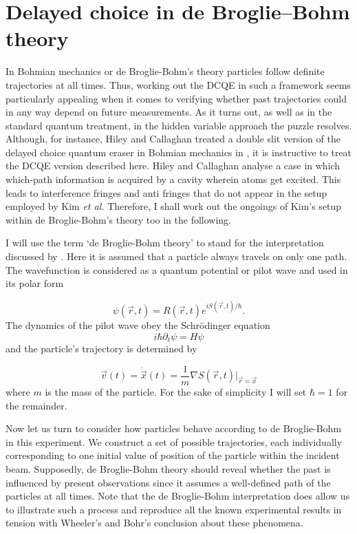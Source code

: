 \documentclass[11pt]{article}
\numberwithin{equation}{section}
\begin{document}
\section{Delayed choice in de Broglie–Bohm theory}
\label{Bohm}

In Bohmian mechanics or de Broglie-Bohm's theory particles follow definite trajectories at all times. Thus, working out the DCQE in such a framework seems particularly appealing when it comes to verifying whether past trajectories could in any way depend on future measurements. As it turns out, as well as in the standard quantum treatment, in the hidden variable approach the puzzle resolves. Although, for instance, Hiley and Callaghan treated a double slit version of the delayed choice quantum eraser in Bohmian mechanics in \cite{hiley2006erased}, it is instructive to treat the DCQE version described here. Hiley and Callaghan analyse a case in which which-path information is acquired by a cavity wherein atoms get excited. This leads to interference fringes and anti fringes that do not appear in the setup employed by Kim \textit{et al.} Therefore, I shall work out the ongoings of Kim's setup within de Broglie-Bohm's theory too in the following. 

I will use the term `de Broglie-Bohm theory' to stand for the interpretation discussed by \cite{bohm2006undivided}. Here it is assumed that a particle always travels on only one path. The wavefunction is considered as a quantum potential or pilot wave and used in its polar form

\begin{equation}
\psi(\vec{r},t)=R(\vec{r},t)e^{iS(\vec{r},t)/\hbar}.
\end{equation} The dynamics of the pilot wave obey the Schrödinger equation
\begin{equation}
i\hbar\partial_t\psi=H\psi
\end{equation} and the particle's trajectory is determined by

\begin{equation}
\vec{v}\left(t\right)=\dot{\vec{x}}(t)=\frac{1}{m}\nabla S(\vec{r},t)|_{\vec{r}=\vec{x}}
\end{equation} where $m$ is the mass of the particle. For the sake of simplicity I will set $\hbar=1$ for the remainder.

Now let us turn to consider how particles behave according to de Broglie-Bohm in this experiment. We construct a set of possible trajectories, each individually corresponding to one initial value of position of the particle within the incident beam. Supposedly, de Broglie-Bohm theory should reveal whether the past is influenced by present observations since it assumes a well-defined path of the particles at all times. Note that the de Broglie-Bohm interpretation does allow us to illustrate such a process and reproduce all the known experimental results in tension with Wheeler's and Bohr's conclusion about these phenomena.
\end{document}
